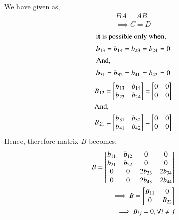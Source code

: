 \documentclass[journal,12pt,twocolumn]{IEEEtran}
\begin{document}
We have given as,
\begin{align}
BA = AB\\
\implies C = D
\end{align}
\begin{align}
\intertext{it is possible only when,}
b_{13}= b_{14} = b_{23}= b_{24} = 0 \\
\intertext{And,}
 b_{31} = b_{32} = b_{41} = b_{42} = 0
 \end{align}
 \begin{align}
B_{12} =  \begin{bmatrix}
b_{13} & b_{14}\\ 
b_{23}  & b_{24}  
\end{bmatrix} =  \begin{bmatrix}
0 & 0\\ 
0  & 0  
\end{bmatrix}\\ 
\intertext{And,}
B_{21} =  \begin{bmatrix}
b_{31} & b_{32}\\
b_{41}  & b_{42}  
\end{bmatrix}  =  \begin{bmatrix}
0 & 0\\ 
0  & 0  
\end{bmatrix} 
\end{align}
Hence, therefore matrix $B$ becomes,
\begin{align}
B =  \begin{bmatrix}
b_{11} & b_{12}  & 0       & 0 \\ 
b_{21} & b_{22}  & 0       & 0  \\
0      & 0       & 2b_{33} & 2b_{34}  \\
0      & 0       & 2b_{43} & 2b_{44}    
\end{bmatrix}\\
\implies B =  \begin{bmatrix}
B_{11} & \huge{0} \\ 
\huge{0}  & B_{22}  
\end{bmatrix}\\
\implies B_{ij} = 0, \forall i \neq j
\end{align}
\end{document}
